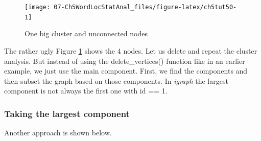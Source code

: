 \documentclass[
]{article}
\newenvironment{Shaded}{\begin{snugshade}}{\end{snugshade}}
\newcommand{\DecValTok}[1]{\textcolor[rgb]{0.00,0.00,0.81}{#1}}
\newcommand{\FunctionTok}[1]{\textcolor[rgb]{0.13,0.29,0.53}{\textbf{#1}}}
\newcommand{\NormalTok}[1]{#1}
\newcommand{\OtherTok}[1]{\textcolor[rgb]{0.56,0.35,0.01}{#1}}
\newcommand{\SpecialCharTok}[1]{\textcolor[rgb]{0.81,0.36,0.00}{\textbf{#1}}}
\begin{document}
\begin{figure}

{\centering \texttt{[image: 07-Ch5WordLocStatAnal\_files/figure-latex/ch5tut50-1]} 

}

\caption{One big cluster and unconnected nodes}\label{fig:ch5tut50}
\end{figure}

The rather ugly Figure \ref{fig:ch5tut50} shows the 4 nodes. Let us delete and repeat the cluster analysis. But instead of using the delete\_vertices() function like in an earlier example, we just use the main component. First, we find the components and then subset the graph based on those components. In \emph{igraph} the largest component is not always the first one with id == 1.

\hypertarget{taking-the-largest-component}{%
\subsubsection{Taking the largest component}\label{taking-the-largest-component}}

\footnotesize

\begin{Shaded}
\end{Shaded}

\normalsize

Another approach is shown below.

\footnotesize

\begin{Shaded}
\end{Shaded}
\end{document}
